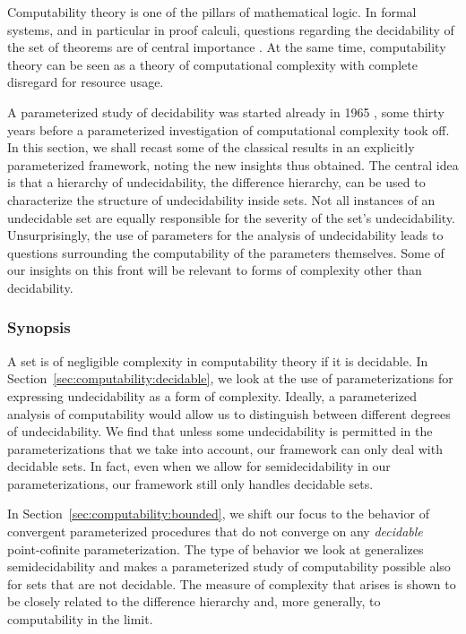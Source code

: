 \label{sec:computability}%

Computability theory \parencite{rogers1967theory} is one of the pillars of mathematical logic.
In formal systems, and in particular in proof calculi, questions regarding the decidability of the set of theorems are of central importance \parencite{kleene1967mathematical,troelstra2000basic}.
At the same time, computability theory can be seen as a theory of computational complexity with complete disregard for resource usage.

A parameterized study of decidability was started already in 1965 \parencite{putnam1965trial,gold1965limiting}, some thirty years before a parameterized investigation of computational complexity took off.
In this section, we shall recast some of the classical results in an explicitly parameterized framework, noting the new insights thus obtained.
The central idea is that a hierarchy of undecidability, the difference hierarchy, can be used to characterize the structure of undecidability inside sets.
Not all instances of an undecidable set are equally responsible for the severity of the set's undecidability.
Unsurprisingly, the use of parameters for the analysis of undecidability leads to questions surrounding the computability of the parameters themselves.
Some of our insights on this front will be relevant to forms of complexity other than decidability.

\subsubsection{Synopsis}
A set is of negligible complexity in computability theory if it is decidable.
In Section~\ref{sec:computability:decidable}, we look at the use of parameterizations for expressing undecidability as a form of complexity.
Ideally, a parameterized analysis of computability would allow us to distinguish between different degrees of undecidability.
We find that unless some undecidability is permitted in the parameterizations that we take into account, our framework can only deal with decidable sets.
In fact, even when we allow for semidecidability in our parameterizations, our framework still only handles decidable sets.

In Section~\ref{sec:computability:bounded}, we shift our focus to the behavior of convergent parameterized procedures that do not converge on any \emph{decidable} point-cofinite parameterization.
The type of behavior we look at generalizes semidecidability and makes a parameterized study of computability possible also for sets that are not decidable.
The measure of complexity that arises is shown to be closely related to the difference hierarchy and, more generally, to computability in the limit.

